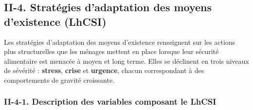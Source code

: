 \documentclass[
]{article}
\begin{document}
\hypertarget{ii-4.-stratuxe9gies-dadaptation-des-moyens-dexistence-lhcsi}{%
\subsection{II-4. Stratégies d'adaptation des moyens d'existence
(LhCSI)}\label{ii-4.-stratuxe9gies-dadaptation-des-moyens-dexistence-lhcsi}}

Les stratégies d'adaptation des moyens d'existence renseignent sur les
actions plus structurelles que les ménages mettent en place lorsque leur
sécurité alimentaire est menacée à moyen et long terme. Elles se
déclinent en trois niveaux de sévérité : \textbf{stress}, \textbf{crise}
et \textbf{urgence}, chacun correspondant à des comportements de gravité
croissante.

\hypertarget{ii-4-1.-description-des-variables-composant-le-lhcsi}{%
\subsubsection{II-4-1. Description des variables composant le
LhCSI}\label{ii-4-1.-description-des-variables-composant-le-lhcsi}}
\end{document}
